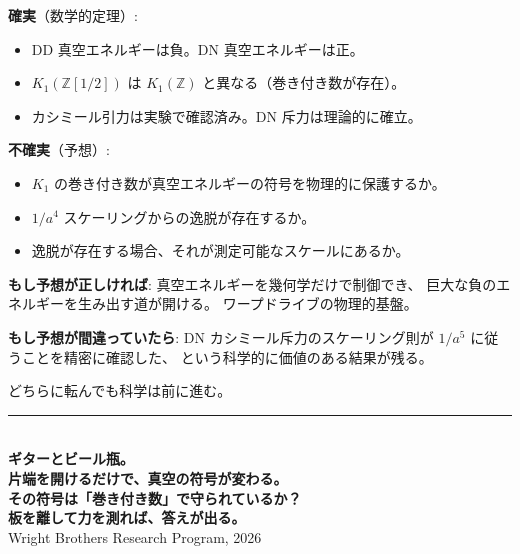 \documentclass[12pt,a4paper]{article}
\begin{document}
\begin{honestbox}[何が確実で何が不確実か]

\textbf{確実}（数学的定理）:
\begin{itemize}
\item DD 真空エネルギーは負。DN 真空エネルギーは正。
\item $K_1(\mathbb{Z}[1/2])$ は $K_1(\mathbb{Z})$ と異なる（巻き付き数が存在）。
\item カシミール引力は実験で確認済み。DN 斥力は理論的に確立。
\end{itemize}

\textbf{不確実}（予想）:
\begin{itemize}
\item $K_1$ の巻き付き数が真空エネルギーの符号を物理的に保護するか。
\item $1/a^4$ スケーリングからの逸脱が存在するか。
\item 逸脱が存在する場合、それが測定可能なスケールにあるか。
\end{itemize}

\textbf{もし予想が正しければ}:
真空エネルギーを幾何学だけで制御でき、
巨大な負のエネルギーを生み出す道が開ける。
ワープドライブの物理的基盤。

\textbf{もし予想が間違っていたら}:
DN カシミール斥力のスケーリング則が
$1/a^5$ に従うことを精密に確認した、
という科学的に価値のある結果が残る。

どちらに転んでも科学は前に進む。
\end{honestbox}

\vfill

\begin{center}
\rule{10cm}{0.4pt}\\[0.5cm]
{\Large\bfseries ギターとビール瓶。}\\[0.2cm]
{\Large\bfseries 片端を開けるだけで、真空の符号が変わる。}\\[0.2cm]
{\Large\bfseries その符号は「巻き付き数」で守られているか？}\\[0.2cm]
{\Large\bfseries 板を離して力を測れば、答えが出る。}\\[0.3cm]
{\small Wright Brothers Research Program, 2026}
\end{center}
\end{document}
